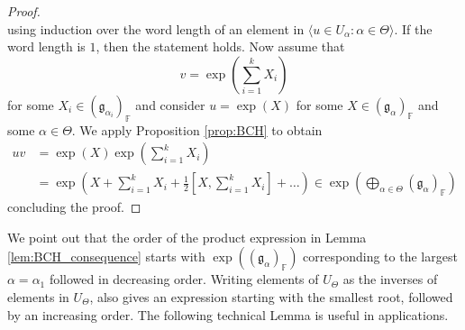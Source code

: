 \documentclass[12pt]{amsart}
\newcommand{\F}{\mathbb{F} }
\newcommand{\frakg}{\mathfrak{g}}
\numberwithin{equation}{section}
\theoremstyle{remark} %
\begin{document}
\begin{proof}
$$	$$
	using induction over the word length of an element in $\langle u \in U_{\alpha} \colon \alpha \in \Theta \rangle $. If the word length is $1$, then the statement holds. Now assume that 
	$$
	v =\exp\left( \sum_{i=1}^k X_i\right)
	$$
	for some $X_i \in (\frakg_{\alpha_i})_\F$ and consider $u=\exp(X)$ for some $X\in (\frakg_{\alpha})_\F$ and some $\alpha \in \Theta$. We apply Proposition \ref{prop:BCH} to obtain
	\begin{align*}
		uv &= \exp(X) \exp\left(\sum_{i=1}^kX_i\right) \\
		&= \exp\left( X + \sum_{i=1}^k X_i + \frac{1}{2}\left[X, \sum_{i=1}^k X_i\right] + \ldots \right) \in \exp\left( \bigoplus_{\alpha \in \Theta} (\frakg_\alpha)_\F\right)
	\end{align*}
	concluding the proof.
\end{proof}
We point out that the order of the product expression in Lemma \ref{lem:BCH_consequence} starts with $\exp ((\frakg_{\alpha})_\F)$ corresponding to the largest $\alpha = \alpha_1$ followed in decreasing order. Writing elements of $U_{\Theta}$ as the inverses of elements in $U_\Theta$, also gives an expression starting with the smallest root, followed by an increasing order. The following technical Lemma is useful in applications.
\end{document}
